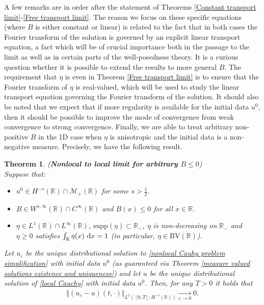 \documentclass[11pt,reqno]{amsart}
\newtheorem{thm}{Theorem}[section]
\numberwithin{equation}{section}
\def\dd{{\rm d}}
\begin{document}
A few remarks are in order after the statement of Theorems \ref{Constant transport limit}-\ref{Free transport limit}. The reason we focus on these specific equations (where $B$ is either constant or linear) is related to the fact that in both cases the Fourier transform of the solution is governed by an explicit linear transport equation, a fact which will be of crucial importance both in the passage to the limit as well as in certain parts of the well-posedness theory. It is a curious question whether it is possible to extend the results to more general $B$. The requirement that $\eta$ is even in Theorem \ref{Free transport limit} is to ensure that the Fourier transform of $\eta$ is real-valued, which will be used to study the linear transport equation governing the Fourier transform of the solution. It should also be noted that we expect that if more regularity is available for the initial data $u^{0}$, then it should be possible to improve the mode of convergence from weak convergence to strong convergence.
Finally, we are able to treat arbitrary non-positive $B$ in the 1D case when $\eta$ is anisotropic and the initial data is a non-negative measure. Precisely, we have the following result. 
\begin{thm} \textup{(\textbf{Nonlocal to local limit for arbitrary $B\leq 0$})}\\
Suppose that: 
\begin{itemize}
    \item $u^{0}\in H^{-s}(\mathbb{R})\cap \mathcal{M}_{+}(\mathbb{R})$ for some $s>\frac{1}{2}$. 
    \item $B\in W^{s,\infty}(\mathbb{R})\cap C^{\infty}(\mathbb{R})$ and $B(x)\leq 0$ for all $x\in \mathbb{R}$. 
    \item $\eta\in L^{1}(\mathbb{R})\cap L^{\infty}(\mathbb{R})$, $\mathrm{supp}(\eta)\subset \mathbb{R}_{-}$, $\eta$ is non-decreasing on $\mathbb{R}_{-}$ and $\eta\geq 0$ satisfies $\int_{\mathbb{R}}\eta(x)\ \dd x=1$ (in particular, $\eta\in \mathrm{BV}(\mathbb{R})$).  
\end{itemize}
Let $u_{\varepsilon}$ be the unique distributional  solution to \eqref{nonlocal Cauhy problem simplification} with initial data $u^{0}$ (as guaranteed via Theorem \ref{measure valued solutions existence and uniqueness}) and let $u$ be the unique distributional solution of \eqref{local Cauchy} with initial data $u^{0}$. 
Then, for any $T>0$ it holds that 
\begin{align*}
\left\Vert (u_{\varepsilon}-u)(t,\cdot)\right\Vert_{L^{2}([0,T];H^{-s}(\mathbb{R}))}\underset{\varepsilon \rightarrow 0}{\rightarrow}0.  
\end{align*}
\label{nonlocal to local general B}
\end{thm}
\end{document}
